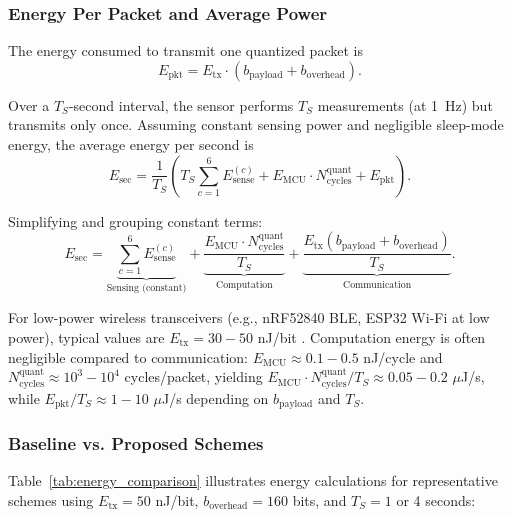 \subsubsection{Energy Per Packet and Average Power}

The energy consumed to transmit one quantized packet is
\begin{equation}
E_{\text{pkt}} = E_{\text{tx}} \cdot (b_{\text{payload}} + b_{\text{overhead}}).
\label{eq:packet_energy}
\end{equation}

Over a $T_S$-second interval, the sensor performs $T_S$ measurements (at 1~Hz) but transmits only once. Assuming constant sensing power and negligible sleep-mode energy, the average energy per second is
\begin{equation}
E_{\text{sec}} = \frac{1}{T_S} \left( T_S \sum_{c=1}^{6} E_{\text{sense}}^{(c)} + E_{\text{MCU}} \cdot N_{\text{cycles}}^{\text{quant}} + E_{\text{pkt}} \right).
\label{eq:energy_per_second}
\end{equation}

Simplifying and grouping constant terms:
\begin{equation}
E_{\text{sec}} = \underbrace{\sum_{c=1}^{6} E_{\text{sense}}^{(c)}}_{\text{Sensing (constant)}} + \underbrace{\frac{E_{\text{MCU}} \cdot N_{\text{cycles}}^{\text{quant}}}{T_S}}_{\text{Computation}} + \underbrace{\frac{E_{\text{tx}} (b_{\text{payload}} + b_{\text{overhead}})}{T_S}}_{\text{Communication}}.
\label{eq:energy_decomposition}
\end{equation}

For low-power wireless transceivers (e.g., nRF52840 BLE, ESP32 Wi-Fi at low power), typical values are $E_{\text{tx}} = 30-50$ nJ/bit \cite{khan2024artificial}. Computation energy is often negligible compared to communication: $E_{\text{MCU}} \approx 0.1-0.5$ nJ/cycle and $N_{\text{cycles}}^{\text{quant}} \approx 10^3-10^4$ cycles/packet, yielding $E_{\text{MCU}} \cdot N_{\text{cycles}}^{\text{quant}} / T_S \approx 0.05-0.2$ $\mu$J/s, while $E_{\text{pkt}} / T_S \approx 1-10$ $\mu$J/s depending on $b_{\text{payload}}$ and $T_S$.

\subsubsection{Baseline vs. Proposed Schemes}

Table~\ref{tab:energy_comparison} illustrates energy calculations for representative schemes using $E_{\text{tx}} = 50$ nJ/bit, $b_{\text{overhead}} = 160$ bits, and $T_S = 1$ or 4 seconds:

